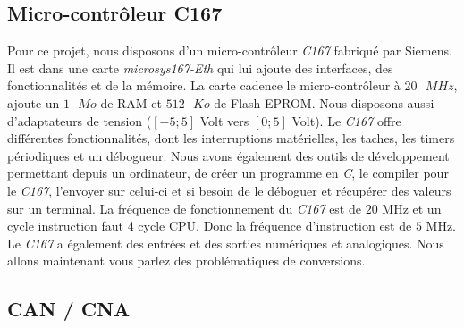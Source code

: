 	\subsection{Micro-contrôleur C167}
Pour ce projet, nous disposons d'un micro-contrôleur \emph{C167} fabriqué par Siemens. Il est dans une carte \emph{microsys167-Eth} qui lui  ajoute des interfaces, des fonctionnalités et de la mémoire. La carte cadence le micro-contrôleur à $20\text{ }MHz$, ajoute un $1\text{ }Mo$ de RAM et $512\text{ } Ko$ de Flash-EPROM. Nous disposons aussi d'adaptateurs de tension ($\left[-5;5\right]$ Volt vers $\left[0;5\right]$ Volt). Le \emph{C167} offre différentes fonctionnalités, dont les interruptions matérielles, les taches, les timers périodiques et un débogueur. Nous avons également des outils de développement permettant depuis un ordinateur, de créer un programme en \emph{C}, le compiler pour le \emph{C167}, l'envoyer sur celui-ci et si besoin de le déboguer et récupérer des valeurs sur un terminal. La fréquence de fonctionnement du \emph{C167} est de $20 $ MHz et un cycle instruction faut 4 cycle CPU. Donc la fréquence d'instruction est de $5 $ MHz.
Le \emph{C167} a également des entrées et des sorties numériques et analogiques. Nous allons maintenant vous parlez des problématiques de conversions.
	\subsection{CAN / CNA}

